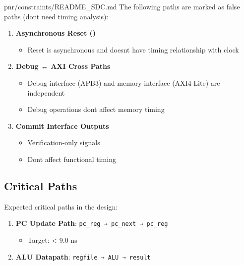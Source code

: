 \begin{relocated}{pnr/constraints/README_SDC.md}
The following paths are marked as false paths (don\textquotesingle t
need timing analysis):

\begin{enumerate}
\def\labelenumi{\arabic{enumi}.}
\item
  \textbf{Asynchronous Reset ()}

  \begin{itemize}
  \tightlist
  \item
    Reset is asynchronous and doesn\textquotesingle t have timing
    relationship with clock
  \end{itemize}
\item
  \textbf{Debug ↔ AXI Cross Paths}

  \begin{itemize}
  \tightlist
  \item
    Debug interface (APB3) and memory interface (AXI4-Lite) are
    independent
  \item
    Debug operations don\textquotesingle t affect memory timing
  \end{itemize}
\item
  \textbf{Commit Interface Outputs}

  \begin{itemize}
  \tightlist
  \item
    Verification-only signals
  \item
    Don\textquotesingle t affect functional timing
  \end{itemize}
\end{enumerate}

\subsection{Critical Paths}\label{tm:pd:constraints-readme-sdc:critical-paths}

Expected critical paths in the design:

\begin{enumerate}
\def\labelenumi{\arabic{enumi}.}
\item
  \textbf{PC Update Path}:
  \texttt{pc\_\allowbreak{}reg\ →\ pc\_\allowbreak{}next\ →\ pc\_\allowbreak{}reg}

  \begin{itemize}
  \tightlist
  \item
    Target: \textless{} 9.0 ns
  \end{itemize}
\item
  \textbf{ALU Datapath}: \texttt{regfile\ →\ ALU\ →\ result}


\end{enumerate}
\end{relocated}
